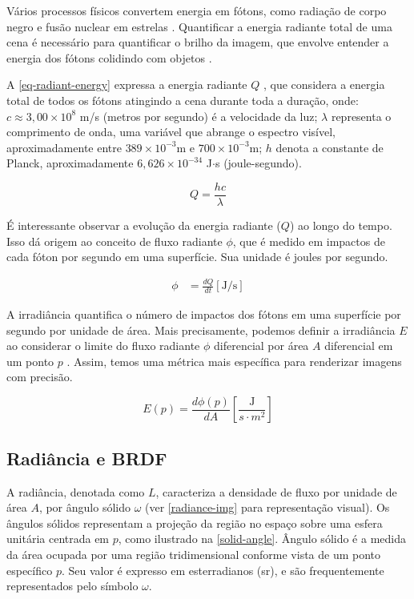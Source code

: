 \documentclass[english, 
               brazil, 
               bsc] %
               {dcomp-abntex2}
\begin{document}
Vários processos físicos convertem energia em fótons, como radiação de corpo negro e fusão nuclear em estrelas \cite{black_body_radiation}. Quantificar a energia radiante total de uma cena é necessário para quantificar o brilho da imagem, que envolve entender a energia dos fótons colidindo com objetos \cite{rendering_judice}.

A \autoref{eq-radiant-energy} expressa a energia radiante \( Q \) \cite{pbr}, que considera a energia total de todos os fótons atingindo a cena durante toda a duração, onde:  \( c  \approx 3,00 \times 10^8 \) m/s (metros por segundo) é a velocidade da luz; \( \lambda \) representa o comprimento de onda, uma variável que abrange o espectro visível, aproximadamente entre \( 389 \times 10^{-3} \)m e \(700 \times 10^{-3} \)m; \( h \) denota a constante de Planck, aproximadamente \( 6,626 \times 10^{-34} \) J$\cdot$s (joule-segundo).


\begin{equation}\label{eq-radiant-energy}
Q = \frac{hc}{\lambda}
\end{equation}



É interessante observar a evolução da energia radiante ($Q$) ao longo do tempo. Isso dá origem ao conceito de fluxo radiante $\phi$, que é medido em impactos de cada fóton por segundo em uma superfície. Sua unidade é joules por segundo.

\begin{align*} 
  \phi &= \frac{dQ}{dt} [\text{J/s}] 
\end{align*}

A irradiância quantifica o número de impactos dos fótons em uma superfície por segundo por unidade de área. Mais precisamente, podemos definir a irradiância $E$ ao considerar o limite do fluxo radiante $\phi$ diferencial por área $A$ diferencial em um ponto $p$ \cite[~5.4.1]{pbr}. Assim, temos uma métrica mais específica para renderizar imagens com precisão.

$$
 E(p) = \frac{d\phi(p)}{dA} \left[ \frac{\text{J}} {s\cdot m^2} \right]
$$


\subsection{Radiância e BRDF} \label{brdf}

A radiância,  denotada como \( L \), caracteriza a densidade de fluxo por unidade de área \( A \), por ângulo sólido \(\omega \) (ver \autoref{radiance-img} para representação visual). Os ângulos sólidos representam a projeção da região no espaço sobre uma esfera unitária centrada em \( p \), como ilustrado na \autoref{solid-angle}. Ângulo sólido é a medida da área ocupada por uma região tridimensional conforme vista de um ponto específico \( p \). Seu valor é expresso em esterradianos (sr), e são frequentemente representados pelo símbolo \( \omega \).
\end{document}

